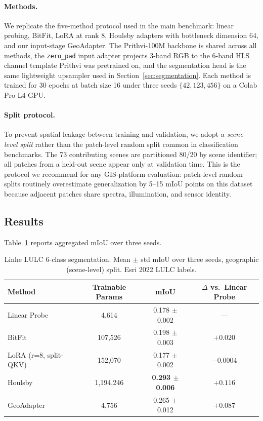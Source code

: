 \paragraph{Methods.} We replicate the five-method protocol used in the main benchmark: linear probing, BitFit, LoRA at rank 8, Houlsby adapters with bottleneck dimension 64, and our input-stage GeoAdapter. The Prithvi-100M backbone is shared across all methods, the \texttt{zero\_pad} input adapter projects 3-band RGB to the 6-band HLS channel template Prithvi was pretrained on, and the segmentation head is the same lightweight upsampler used in Section~\ref{sec:segmentation}. Each method is trained for 30 epochs at batch size 16 under three seeds $\{42, 123, 456\}$ on a Colab Pro L4 GPU.

\paragraph{Split protocol.} To prevent spatial leakage between training and validation, we adopt a \emph{scene-level split} rather than the patch-level random split common in classification benchmarks. The 73 contributing scenes are partitioned 80/20 by scene identifier; all patches from a held-out scene appear only at validation time. This is the protocol we recommend for any GIS-platform evaluation: patch-level random splits routinely overestimate generalization by 5--15 mIoU points on this dataset because adjacent patches share spectra, illumination, and sensor identity.

\subsection{Results}

Table~\ref{tab:linhe-lulc} reports aggregated mIoU over three seeds.

\begin{table}[h]
\centering
\small
\caption{Linhe LULC 6-class segmentation. Mean $\pm$ std mIoU over three seeds, geographic (scene-level) split. Esri 2022 LULC labels.}
\label{tab:linhe-lulc}
\begin{tabular}{lccc}
\toprule
Method & Trainable Params & mIoU & $\Delta$ vs.\ Linear Probe \\
\midrule
Linear Probe & 4{,}614       & 0.178 $\pm$ 0.002 & --- \\
BitFit       & 107{,}526     & 0.198 $\pm$ 0.003 & $+0.020$ \\
LoRA (r=8, split-QKV) & 152{,}070 & 0.177 $\pm$ 0.002 & $-0.0004$ \\
Houlsby      & 1{,}194{,}246 & \textbf{0.293 $\pm$ 0.006} & $\mathbf{+0.116}$ \\
GeoAdapter   & 4{,}756       & 0.265 $\pm$ 0.012 & $+0.087$ \\
\bottomrule
\end{tabular}
\end{table}

